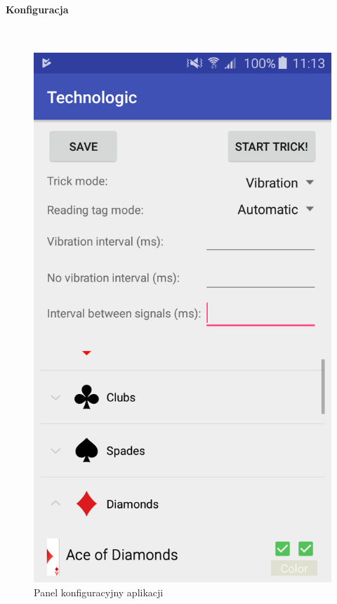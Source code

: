 \documentclass{article}
\numberwithin{equation}{section}
\begin{document}
\paragraph{Konfiguracja}\mbox{}\\
\begin{figure}[H]
\centering
\includegraphics[scale=0.22]{mainActivity.png}
\caption{Panel konfiguracyjny aplikacji}
\end{figure}
\end{document}
